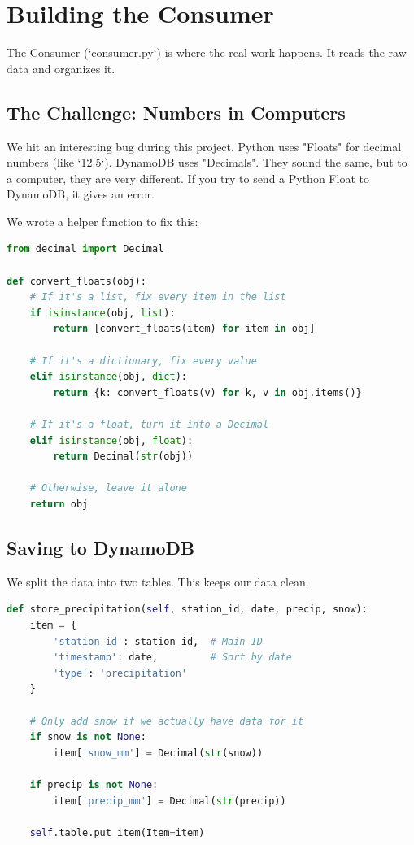 \documentclass[12pt, a4paper]{article}
\begin{document}
\newpage

\section{Building the Consumer}

The Consumer (`consumer.py`) is where the real work happens. It reads the raw data and organizes it.

\subsection{The Challenge: Numbers in Computers}
We hit an interesting bug during this project. Python uses "Floats" for decimal numbers (like `12.5`). DynamoDB uses "Decimals". They sound the same, but to a computer, they are very different. If you try to send a Python Float to DynamoDB, it gives an error.

We wrote a helper function to fix this:

\begin{lstlisting}[language=Python, caption=Fixing the Number Format]
from decimal import Decimal

def convert_floats(obj):
    # If it's a list, fix every item in the list
    if isinstance(obj, list):
        return [convert_floats(item) for item in obj]
    
    # If it's a dictionary, fix every value
    elif isinstance(obj, dict):
        return {k: convert_floats(v) for k, v in obj.items()}
        
    # If it's a float, turn it into a Decimal
    elif isinstance(obj, float):
        return Decimal(str(obj))
        
    # Otherwise, leave it alone
    return obj
\end{lstlisting}

\subsection{Saving to DynamoDB}
We split the data into two tables. This keeps our data clean.

\begin{lstlisting}[language=Python, caption=Saving Precipitation Data]
def store_precipitation(self, station_id, date, precip, snow):
    item = {
        'station_id': station_id,  # Main ID
        'timestamp': date,         # Sort by date
        'type': 'precipitation'
    }
    
    # Only add snow if we actually have data for it
    if snow is not None:
        item['snow_mm'] = Decimal(str(snow))
    
    if precip is not None:
        item['precip_mm'] = Decimal(str(precip))
        
    self.table.put_item(Item=item)
\end{lstlisting}
\end{document}
